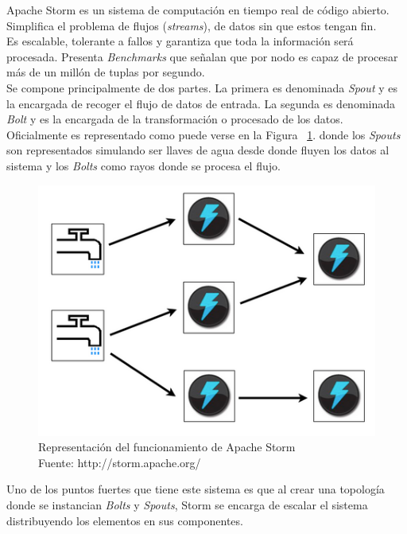 	Apache Storm es un sistema de computación en tiempo real de código abierto. Simplifica el problema de flujos (\textit{streams}), de datos sin que estos tengan fin.\\
	Es escalable, tolerante a fallos y garantiza que toda la información será procesada. Presenta \textit{Benchmarks} que señalan que por nodo es capaz de procesar más de un millón de tuplas por segundo.\\
	Se compone principalmente de dos partes. La primera es denominada \textit{Spout} y es la encargada de recoger el flujo de datos de entrada. La segunda es denominada \textit{Bolt} y es la encargada de la transformación o procesado de los datos.\\
	Oficialmente es representado como puede verse en la Figura ~\ref{fig:stormBeLike}. donde los \textit{Spouts} son representados simulando ser llaves de agua desde donde fluyen los datos al sistema y los \textit{Bolts} como rayos donde se procesa el flujo.

	\begin{figure}[!ht]
		\centering
		\captionsetup{justification=centering}
		\includegraphics[scale=0.6]{images/stormBeLike.png}
		\caption[Representación del funcionamiento de Apache Storm.]{Representación del funcionamiento de Apache Storm\\Fuente: http://storm.apache.org/}
		\label{fig:stormBeLike}
	\end{figure}

	Uno de los puntos fuertes que tiene este sistema es que al crear una topología donde se instancian \textit{Bolts} y \textit{Spouts}, Storm se encarga de escalar el sistema distribuyendo los elementos en sus componentes.

